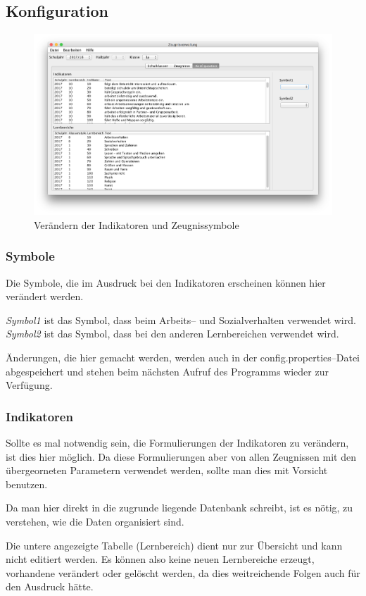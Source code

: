 \documentclass[a4paper,notitlepage,parskip]{scrartcl}
\newcommand\ott{\normalfont\ttfamily}
\begin{document}
\subsection{Konfiguration}
\begin{figure}[ht]
\centering
\centerline{\includegraphics[width=1.0\textwidth]{Konfiguration}}
\caption{Verändern der Indikatoren und Zeugnissymbole}
\label{fig:Konfiguration}
\end{figure}
\subsubsection{Symbole}
Die Symbole, die im Ausdruck bei den Indikatoren erscheinen können hier verändert werden.

\emph{Symbol1} ist das Symbol, dass beim Arbeits-- und Sozialverhalten verwendet wird. \emph{Symbol2} ist das Symbol, dass bei den anderen Lernbereichen verwendet wird.

Änderungen, die hier gemacht werden, werden auch in der {\ott config.properties}--Datei abgespeichert und stehen beim nächsten Aufruf des Programms wieder zur Verfügung.
\subsubsection{Indikatoren}
Sollte es mal notwendig sein, die Formulierungen der Indikatoren zu verändern, ist dies hier möglich.
Da diese Formulierungen aber von allen Zeugnissen mit den übergeorneten Parametern verwendet werden, sollte man dies mit Vorsicht benutzen.

Da man hier direkt in die zugrunde liegende Datenbank schreibt, ist es nötig, zu verstehen, wie die Daten organisiert sind.

Die untere angezeigte Tabelle (Lernbereich) dient nur zur Übersicht und kann nicht editiert werden.
Es können also keine neuen Lernbereiche erzeugt, vorhandene verändert oder gelöscht werden, da dies weitreichende Folgen auch für den Ausdruck hätte.
\end{document}
